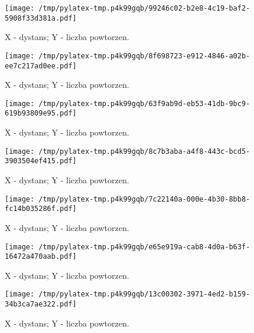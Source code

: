 \documentclass{article}%
\begin{document}
%
\newpage%


\begin{figure}[h]%
\centering%
\texttt{[image: /tmp/pylatex-tmp.p4k99gqb/99246c02-b2e8-4c19-baf2-5908f33d381a.pdf]}%
\caption{X {-} dystans; Y {-} liczba powtorzen.}%
\end{figure}

%
\newpage%


\begin{figure}[h]%
\centering%
\texttt{[image: /tmp/pylatex-tmp.p4k99gqb/8f698723-e912-4846-a02b-ee7c217ad0ee.pdf]}%
\caption{X {-} dystans; Y {-} liczba powtorzen.}%
\end{figure}

%
\newpage%


\begin{figure}[h]%
\centering%
\texttt{[image: /tmp/pylatex-tmp.p4k99gqb/63f9ab9d-eb53-41db-9bc9-619b93809e95.pdf]}%
\caption{X {-} dystans; Y {-} liczba powtorzen.}%
\end{figure}

%
\newpage%


\begin{figure}[h]%
\centering%
\texttt{[image: /tmp/pylatex-tmp.p4k99gqb/8c7b3aba-a4f8-443c-bcd5-3903504ef415.pdf]}%
\caption{X {-} dystans; Y {-} liczba powtorzen.}%
\end{figure}

%
\newpage%


\begin{figure}[h]%
\centering%
\texttt{[image: /tmp/pylatex-tmp.p4k99gqb/7c22140a-000e-4b30-8bb8-fc14b035286f.pdf]}%
\caption{X {-} dystans; Y {-} liczba powtorzen.}%
\end{figure}

%
\newpage%


\begin{figure}[h]%
\centering%
\texttt{[image: /tmp/pylatex-tmp.p4k99gqb/e65e919a-cab8-4d0a-b63f-16472a470aab.pdf]}%
\caption{X {-} dystans; Y {-} liczba powtorzen.}%
\end{figure}

%
\newpage%


\begin{figure}[h]%
\centering%
\texttt{[image: /tmp/pylatex-tmp.p4k99gqb/13c00302-3971-4ed2-b159-34b3ca7ae322.pdf]}%
\caption{X {-} dystans; Y {-} liczba powtorzen.}%
\end{figure}
\end{document}
